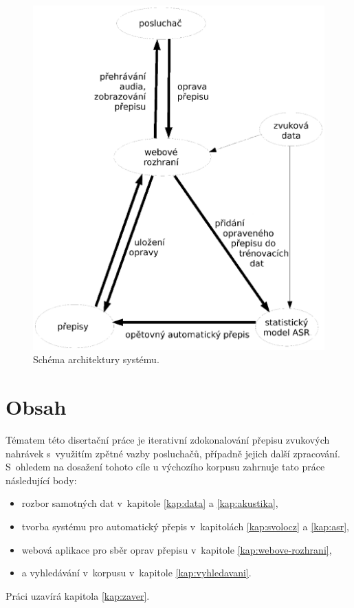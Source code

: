 \begin{figure}[htpb]
\includegraphics[scale=0.9]{rc/arch.eps}
\caption{Schéma architektury systému.}
\label{fig:arch}
\end{figure}

\section{Obsah}

Tématem této disertační práce je iterativní zdokonalování přepisu zvukových nahrávek
s~využitím zpětné vazby posluchačů, případně jejich další zpracování.
S~ohledem na dosažení tohoto cíle u výchozího korpusu zahrnuje tato práce následující body:

\begin{itemize}
\item{rozbor samotných dat v~kapitole \ref{kap:data} a \ref{kap:akustika},}
\item{tvorba systému pro automatický přepis v~kapitolách \ref{kap:svolocz} a \ref{kap:asr},}
\item{webová aplikace pro sběr oprav přepisu v~kapitole \ref{kap:webove-rozhrani},}
\item{a vyhledávání v~korpusu v~kapitole \ref{kap:vyhledavani}.}
\end{itemize}

Práci uzavírá kapitola \ref{kap:zaver}.
